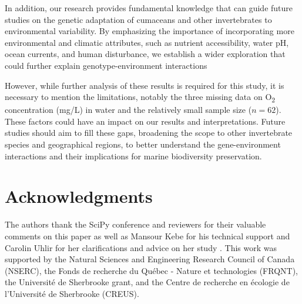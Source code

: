 In addition, our research provides fundamental knowledge that can guide future studies on the genetic adaptation of cumaceans and other invertebrates to environmental variability. By emphasizing the importance of incorporating more environmental and climatic attributes, such as nutrient accessibility, water pH, ocean currents, and human disturbance, we establish a wider exploration that could further explain genotype-environment interactions

However, while further analysis of these results is required for this study, it is necessary to mention the limitations, notably the three missing data on O\textsubscript{2} concentration (mg/L) in water and the relatively small sample size ($n=62$). These factors could have an impact on our results and interpretations. Future studies should aim to fill these gaps, broadening the scope to other invertebrate species and geographical regions, to better understand the gene-environment interactions and their implications for marine biodiversity preservation.

\section{Acknowledgments}\label{acknowledgments}

The authors thank the SciPy conference and reviewers for their valuable comments on this paper as well as Mansour Kebe for his technical support and Carolin Uhlir for her clarifications and advice on her study \citep{uhlir_adding_2021}. This work was supported by the Natural Sciences and Engineering Research Council of Canada (NSERC), the Fonds de recherche du Québec - Nature et technologies (FRQNT), the Université de Sherbrooke grant, and the Centre de recherche en écologie de l’Université de Sherbrooke (CREUS).
